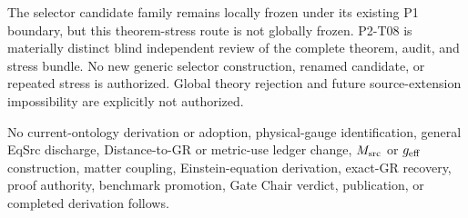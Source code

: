 \documentclass[11pt]{article}
\begin{document}
The selector candidate family remains locally frozen under its existing
P1 boundary, but this theorem-stress route is not globally frozen. P2-T08 is
materially distinct blind independent review of the complete theorem, audit,
and stress bundle. No new generic selector construction, renamed candidate,
or repeated stress is authorized. Global theory rejection and future
source-extension impossibility are explicitly not authorized.

No current-ontology derivation or adoption, physical-gauge identification,
general EqSrc discharge, Distance-to-GR or metric-use ledger change,
\(M_{\rm src}\) or \(g_{\rm eff}\) construction, matter coupling,
Einstein-equation derivation, exact-GR recovery, proof authority, benchmark
promotion, Gate Chair verdict, publication, or completed derivation follows.
\end{document}
